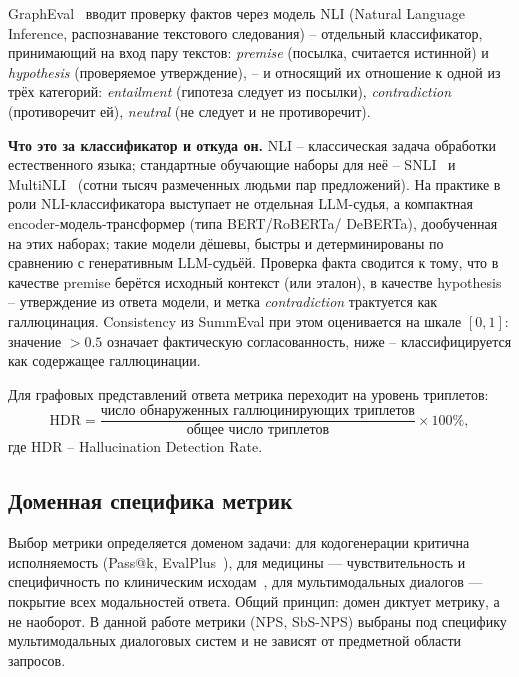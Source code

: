 GraphEval~\cite{sansford2024grapheval} вводит проверку фактов через
модель NLI (Natural Language Inference, распознавание текстового
следования) -- отдельный классификатор, принимающий на вход пару
текстов: \emph{premise} (посылка, считается истинной) и
\emph{hypothesis} (проверяемое утверждение), -- и относящий их
отношение к одной из трёх категорий:
\emph{entailment} (гипотеза следует из посылки),
\emph{contradiction} (противоречит ей),
\emph{neutral} (не следует и не противоречит).

\textbf{Что это за классификатор и откуда он.}
NLI -- классическая задача обработки естественного языка; стандартные
обучающие наборы для неё -- SNLI~\cite{bowman2015snli} и
MultiNLI~\cite{williams2018mnli} (сотни тысяч размеченных людьми пар
предложений).
На практике в роли NLI-классификатора выступает не отдельная
LLM-судья, а компактная encoder-модель-трансформер (типа BERT/RoBERTa/
DeBERTa), дообученная на этих наборах; такие модели дёшевы, быстры и
детерминированы по сравнению с генеративным LLM-судьёй.
Проверка факта сводится к тому, что в качестве premise берётся
исходный контекст (или эталон), в качестве hypothesis -- утверждение
из ответа модели, и метка \emph{contradiction} трактуется как
галлюцинация.
Consistency из SummEval при этом оценивается на шкале $[0, 1]$:
значение $> 0.5$ означает фактическую согласованность, ниже --
классифицируется как содержащее галлюцинации.

Для графовых представлений ответа метрика переходит на уровень
триплетов:
\begin{equation}
    \label{eq:hallucination-rate}
    \mathrm{HDR} =
        \frac{\text{число обнаруженных галлюцинирующих триплетов}}
             {\text{общее число триплетов}}
        \times 100\%,
\end{equation}
где $\mathrm{HDR}$ -- Hallucination Detection Rate.

\subsection{Доменная специфика метрик}
Выбор метрики определяется доменом задачи: для кодогенерации критична исполняемость (Pass@k, EvalPlus~\cite{liu2023evalplus}), для медицины — чувствительность и специфичность по клиническим исходам~\cite{yan2025llmsemeval}, для мультимодальных диалогов — покрытие всех модальностей ответа. Общий принцип: домен диктует метрику, а не наоборот. В данной работе метрики (NPS, SbS-NPS) выбраны под специфику мультимодальных диалоговых систем и не зависят от предметной области запросов.

